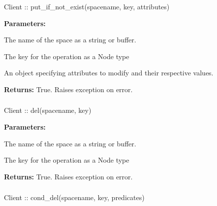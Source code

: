 \subsubsection{}
\label{api:nodejs:put_if_not_exist}
\begin{javascriptcode}
Client :: put_if_not_exist(spacename, key, attributes)
\end{javascriptcode}
\funcdesc 

\noindent\textbf{Parameters:}
\begin{description}[labelindent=\widthof{{\code{attributes}}},leftmargin=*,noitemsep,nolistsep,align=right]
\item[\code{spacename}] The name of the space as a string or buffer.
\item[\code{key}] The key for the operation as a Node type
\item[\code{attributes}] An object specifying attributes to modify and their respective values.
\end{description}

\noindent\textbf{Returns:}
True.  Raises exception on error.

\subsubsection{}
\label{api:nodejs:del}
\begin{javascriptcode}
Client :: del(spacename, key)
\end{javascriptcode}
\funcdesc 

\noindent\textbf{Parameters:}
\begin{description}[labelindent=\widthof{{\code{spacename}}},leftmargin=*,noitemsep,nolistsep,align=right]
\item[\code{spacename}] The name of the space as a string or buffer.
\item[\code{key}] The key for the operation as a Node type
\end{description}

\noindent\textbf{Returns:}
True.  Raises exception on error.

\subsubsection{}
\label{api:nodejs:cond_del}
\begin{javascriptcode}
Client :: cond_del(spacename, key, predicates)
\end{javascriptcode}
\funcdesc 

